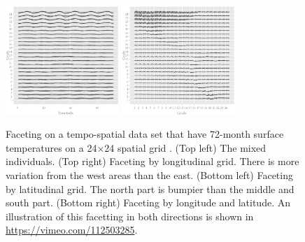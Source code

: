 \documentclass[12pt]{article}
\begin{document}
\begin{itemize}
\begin{center}
\begin{figure}[H]
\begin{centering}
\includegraphics[width=0.38\textwidth]{graph/pipeline-24-2} \includegraphics[width=0.38\textwidth]{graph/pipeline-24-4}
\par\end{centering}

\caption{\label{fig:faceting-2ind}Faceting on a tempo-spatial data set
that have 72-month surface temperatures on a 24$\times$24 spatial grid 
\citep{murrell2010}.  (Top left) The mixed individuals.  (Top right) Faceting
by longitudinal grid. There is more variation from the west areas
than the east.  (Bottom left) Faceting by latitudinal grid.
The north part is bumpier than the middle and south part.
 (Bottom right) Faceting by longitude and latitude. An illustration of this facetting in both directions is shown in \url{https://vimeo.com/112503285}.}
\end{figure}
\par\end{center}



\end{itemize}
\end{document}
